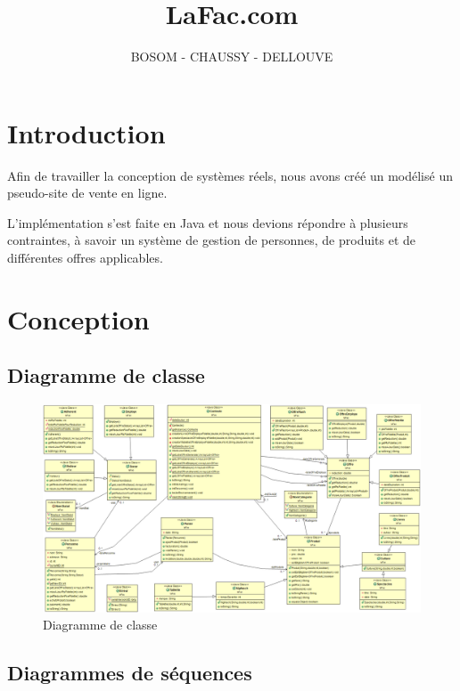 \documentclass{article}
\title{LaFac.com}
\author{BOSOM - CHAUSSY - DELLOUVE}
\begin{document}
\maketitle

\vfill
\section*{Introduction}

Afin de travailler la conception de systèmes réels, nous avons créé un modélisé un pseudo-site de vente en ligne.\par
L'implémentation s'est faite en Java et nous devions répondre à plusieurs contraintes, à savoir un système de gestion de personnes, de produits et de différentes offres applicables.
\vfill

\newpage

\section*{Conception}

\subsection*{Diagramme de classe}


\begin{figure}
	\vfill\hfill %
	\includegraphics[scale=0.36]{diagUML.png}
	\hfill\vfill %
	\caption{Diagramme de classe}
\end{figure}

\subsection*{Diagrammes de séquences}
\end{document}
